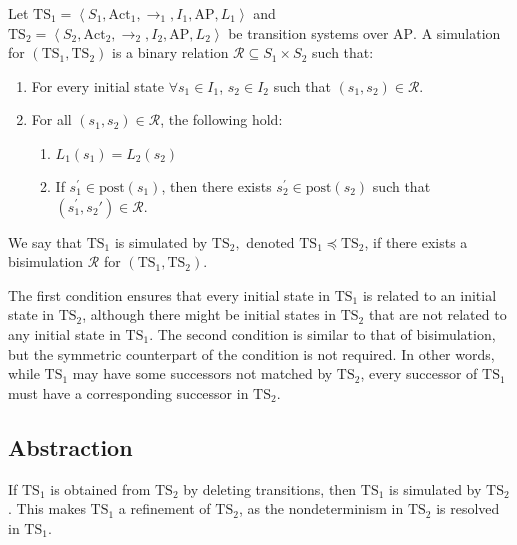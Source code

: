 \begin{definition}
    Let $\text{TS}_1=\left\langle S_1,\text{Act}_1,\rightarrow_1,I_1,\text{AP},L_1\right\rangle$ and \\ $\text{TS}_2=\left\langle S_2,\text{Act}_2,\rightarrow_2,I_2,\text{AP},L_2\right\rangle$ be transition systems over $\text{AP}$. 
    A simulation for $(\text{TS}_1,\text{TS}_2)$ is a binary relation $\mathcal{R}\subseteq S_1\times S_2$ such that: 
    \begin{enumerate}
        \item For every initial state $\forall s_1\in I_1$, $s_2\in I_2$ such that $(s_1,s_2)\in \mathcal{R}$. 
        \item For all $(s_1,s_2)\in \mathcal{R}$, the following hold:
            \begin{enumerate}
                \item $L_1(s_1)=L_2(s_2)$
                \item If $s_1^\prime\in\text{post}(s_1)$, then there exists $s_2^\prime\in\text{post}(s_2)$ such that $(s_1^\prime,s_2\prime)\in\mathcal{R}$. 
            \end{enumerate}
    \end{enumerate}
    We say that $\text{TS}_1$ is simulated by $\text{TS}_2,$ denoted $\text{TS}_1 \preceq \text{TS}_2$, if there exists a bisimulation $\mathcal{R}$ for $(\text{TS}_1,\text{TS}_2)$. 
\end{definition}
\noindent The first condition ensures that every initial state in $\text{TS}_1$ is related to an initial state in $\text{TS}_2$, although there might be initial states in $\text{TS}_2$ that are not related to any initial state in $\text{TS}_1$. 
The second condition is similar to that of bisimulation, but the symmetric counterpart of the condition is not required.
In other words, while $\text{TS}_1$ may have some successors not matched by $\text{TS}_2$, every successor of $\text{TS}_1$ must have a corresponding successor in $\text{TS}_2$.






\subsection{Abstraction}
\begin{definition}
    If $\text{TS}_1$ is obtained from $\text{TS}_2$ by deleting transitions, then $\text{TS}_1$ is simulated by $\text{TS}_2$. 
    This makes $\text{TS}_1$ a refinement of $\text{TS}_2$, as the nondeterminism in $\text{TS}_2$ is resolved in $\text{TS}_1$.
\end{definition}


